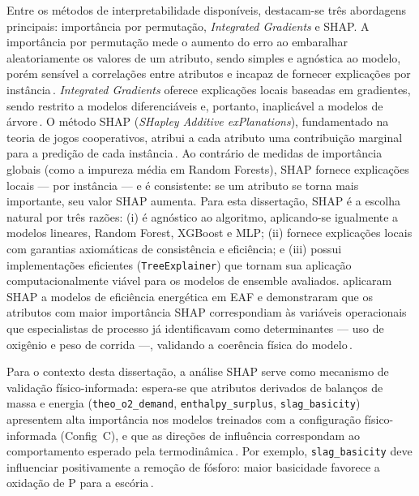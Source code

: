 Entre os métodos de interpretabilidade disponíveis, destacam-se três abordagens principais: importância por permutação, \textit{Integrated Gradients} e SHAP. A importância por permutação mede o aumento do erro ao embaralhar aleatoriamente os valores de um atributo, sendo simples e agnóstica ao modelo, porém sensível a correlações entre atributos e incapaz de fornecer explicações por instância\,\cite{inglis2022visualisation}. \textit{Integrated Gradients} oferece explicações locais baseadas em gradientes, sendo restrito a modelos diferenciáveis e, portanto, inaplicável a modelos de árvore\,\cite{inglis2022visualisation}. O método SHAP (\textit{SHapley Additive exPlanations}), fundamentado na teoria de jogos cooperativos, atribui a cada atributo uma contribuição marginal para a predição de cada instância\,\cite{lundberg2017unified}. Ao contrário de medidas de importância globais (como a impureza média em Random Forests), SHAP fornece explicações locais — por instância — e é consistente: se um atributo se torna mais importante, seu valor SHAP aumenta. Para esta dissertação, SHAP é a escolha natural por três razões: (i) é agnóstico ao algoritmo, aplicando-se igualmente a modelos lineares, Random Forest, XGBoost e MLP; (ii) fornece explicações locais com garantias axiomáticas de consistência e eficiência; e (iii) possui implementações eficientes (\texttt{TreeExplainer}) que tornam sua aplicação computacionalmente viável para os modelos de ensemble avaliados. \citeauthor{manojlovic2022eaf} aplicaram SHAP a modelos de eficiência energética em EAF e demonstraram que os atributos com maior importância SHAP correspondiam às variáveis operacionais que especialistas de processo já identificavam como determinantes — uso de oxigênio e peso de corrida —, validando a coerência física do modelo\,\cite{manojlovic2022eaf}.

Para o contexto desta dissertação, a análise SHAP serve como mecanismo de validação físico-informada: espera-se que atributos derivados de balanços de massa e energia (\texttt{theo\_o2\_demand}, \texttt{enthalpy\_surplus}, \texttt{slag\_basicity}) apresentem alta importância nos modelos treinados com a configuração físico-informada (Config~C), e que as direções de influência correspondam ao comportamento esperado pela termodinâmica\,\cite{manojlovic2022eaf,xia2024dmpinn}. Por exemplo, \texttt{slag\_basicity} deve influenciar positivamente a remoção de fósforo: maior basicidade favorece a oxidação de P para a escória\,\cite{bae2020bof}.

